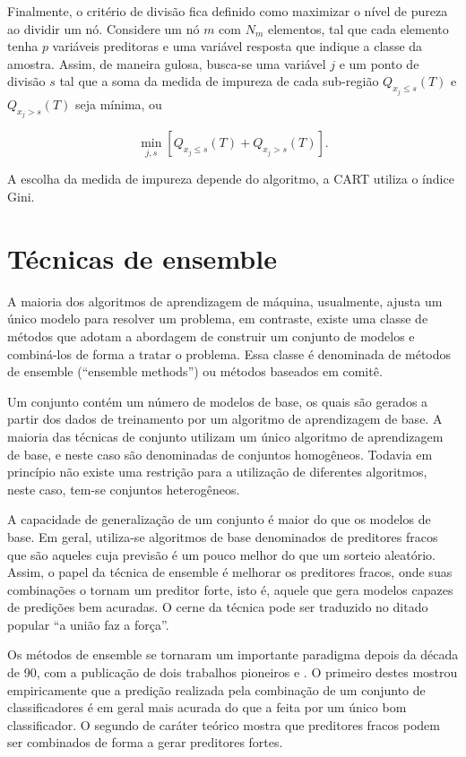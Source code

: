 Finalmente, o critério de divisão fica definido como maximizar o nível de pureza ao dividir um nó. Considere um nó $m$ com $N_m$ elementos, tal que cada elemento tenha $p$ variáveis preditoras e uma variável resposta que indique a classe da amostra. Assim, de maneira gulosa, busca-se uma variável $j$ e um ponto de divisão $s$ tal que a soma da medida de impureza de cada sub-região $Q_{x_j\le{s}}(T)$ e $Q_{x_j>{s}}(T)$ seja mínima, ou

\begin{equation}
\min_{j,s}\left[Q_{x_j\le{s}}(T)+Q_{x_j>{s}}(T)\right]\mbox{.}
\end{equation}

A escolha da medida de impureza depende do algoritmo, a CART utiliza o índice Gini.

\section{Técnicas de ensemble}

A maioria dos algoritmos de aprendizagem de máquina, usualmente, ajusta um único modelo para resolver um problema, em contraste, existe uma classe de métodos que adotam a abordagem de construir um conjunto de modelos e combiná-los de forma a tratar o problema. Essa classe é denominada de métodos de ensemble (``ensemble methods'') ou métodos baseados em comitê.

Um conjunto contém um número de modelos de base, os quais são gerados a partir dos dados de treinamento por um algoritmo de aprendizagem de base. A maioria das técnicas de conjunto utilizam um único algoritmo de aprendizagem de base, e neste caso são denominadas de conjuntos homogêneos. Todavia em princípio não existe uma restrição para a utilização de diferentes algoritmos, neste caso, tem-se conjuntos heterogêneos.

A capacidade de generalização de um conjunto é maior do que os modelos de base. Em geral, utiliza-se algoritmos de base denominados de preditores fracos que são aqueles cuja previsão é um pouco melhor do que um sorteio aleatório. Assim, o papel da técnica de ensemble é melhorar os preditores fracos, onde suas combinações o tornam um preditor forte, isto é, aquele que gera modelos capazes de predições bem acuradas. O cerne da técnica pode ser traduzido no ditado popular ``a união faz a força''.

Os métodos de ensemble se tornaram um importante paradigma depois da década de 90, com a publicação de dois trabalhos pioneiros \cite{HANSEN:1990} e \cite{SCHAPIRE:1990}. O primeiro destes mostrou empiricamente que a predição realizada pela combinação de um conjunto de classificadores é em geral mais acurada do que a feita por um único bom classificador. O segundo de caráter teórico mostra que preditores fracos podem ser combinados de forma a gerar preditores fortes.

